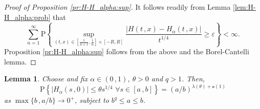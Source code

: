 \documentclass[reqno]{amsart}
\newcommand{\<}{\langle}
\renewcommand{\>}{\rangle}
\renewcommand{\P}{\mathrm{P}}
\newcommand{\1}{\mathbb{1}}
\renewcommand{\ge}{\geqslant}
\renewcommand{\le}{\leqslant}
\newtheorem{lemma}[stat]{Lemma}
\theoremstyle{definition}
\numberwithin{equation}{section}
\begin{document}
\begin{proof}[Proof of Proposition \ref{pr:H-H_alpha:sup}]
	It follows readily from Lemma \ref{lem:H-H_alpha:prob} that
	\[
		\sum_{n=1}^\infty \P\left\{ \sup_{(t,x)\in [\frac{1}{n+1},\frac{1}{n}]\times[-R,R]}
		\frac{|H(t\,,x)-H_\alpha(t\,,x)|}{t^{1/4}} \ge  \varepsilon \right\}<\infty.
	\]
	Proposition \ref{pr:H-H_alpha:sup} follows from the above and the Borel-Cantelli lemma.
\end{proof}


\begin{lemma}\label{lem:H_alpha}
	Choose and fix $\alpha \in (0\,,1)$, $\theta>0$ and $q>1$. Then,
	\[
		\P\left\{ |H_\alpha(s\,,0)|\le \theta s^{1/4}\,\,\forall s\in [a\,,b]\right\}
		=  (a/b)^{\lambda(\theta) + \mathscr{o}(1)}
	\]
	as $\max\{b\,,a/b\} \to 0^+$, subject to $b^q \le a \le b$.
\end{lemma}
\end{document}
